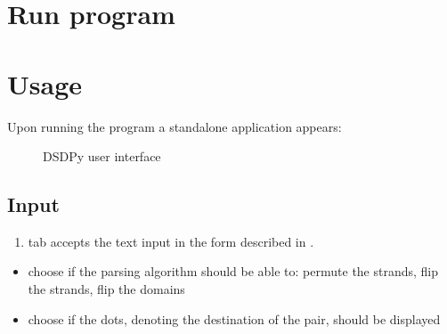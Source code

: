 \documentclass[a4paper,12pt,oneside,english]{sphinxmanual}
\begin{document}
\section{Run program}
\label{\detokenize{tutorial:run-program}}
%
\begin{sphinxVerbatim}[commandchars=\\\{\}]
 
\end{sphinxVerbatim}


\section{Usage}
\label{\detokenize{tutorial:usage}}
Upon running the program a standalone application appears:

\begin{figure}[htbp]
\centering
\capstart

\noindent{}
\caption{DSDPy user interface}\label{\detokenize{tutorial:id1}}\end{figure}


\subsection{Input}
\label{\detokenize{tutorial:input}}\begin{enumerate}
\item {} 
 tab accepts the text input in the form described in .

\end{enumerate}
\begin{itemize}
\item {} 
choose if the parsing algorithm should be able to: permute the strands, flip the strands, flip the domains

\item {} 
choose if the dots, denoting the destination of the pair, should be displayed

\end{itemize}
\end{document}
